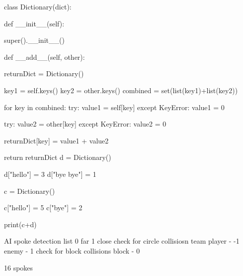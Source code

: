 \begin{mpy}
class Dictionary(dict):
    
    def __init__(self):
        
        super().__init__()
        
    def __add__(self, other):
        
        returnDict = Dictionary()
        
        key1 = self.keys()
        key2 = other.keys()
        combined = set(list(key1)+list(key2))
        
        for key in combined:
            try:
                value1 = self[key]
            except KeyError:
                value1 = 0
            
            try:
                value2 = other[key]
            except KeyError:
                value2 = 0
            
            returnDict[key] = value1 + value2
        
        return returnDict
d = Dictionary()

d["hello"] = 3
d["bye bye"] = 1

c = Dictionary()


c["hello"] = 5
c["bye"] = 2


print(c+d)
\end{mpy}


AI spoke detection list
0 far 1 close
check for circle collisiosn
team player - -1
enemy - 1
check for block collisions
block - 0

16 spokes